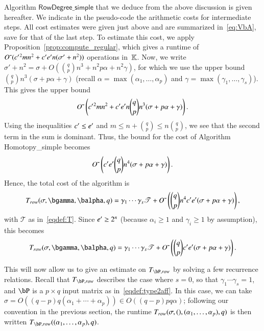 \documentclass[amsthm]{elsart}
\begin{document}
Algorithm $\mathsf{RowDegree\_simple}$ that we deduce from the above
discussion is given hereafter. We indicate in the pseudo-code the
arithmetic costs for intermediate steps. All cost estimates were given
just above and are summarized in~\eqref{eq:VbA}, save for that of the
last step. To estimate this cost, we apply
Proposition~\ref{prop:compute_regular}, which gives a runtime of
$\softO(\rc^2 m n^2 + \rc \re n (\sigma' + n^2))$ operations in~$\KK$.
Now, we write $\sigma'+ n^2 = \sigma +O( {q \choose p} n^3 + n^2 p
\alpha + n^2 \gamma)$, for which we use the upper bound ${q \choose p}
n^3(\sigma + p\alpha + \gamma)$ (recall $\alpha=\max(\alpha_1, \ldots,
\alpha_p)$ and $\gamma=\max(\gamma_1, \ldots, \gamma_s)$).  This gives
the upper bound
\[
\softO\left (\rc^2 m n^2 + \rc\re n {q \choose p} n^3(\sigma + p\alpha + \gamma )\right ).
\]
Using the inequalities $\rc \le \re$ and $m\leq n + {q \choose p} \le n {q \choose p}$,
we see that the second term in the sum is dominant.
Thus, the bound for the cost of Algorithm {\sf Homotopy\_simple} becomes
\[
\softO\left ( \rc\re {q \choose p} n^4(\sigma + p\alpha + \gamma) \right ).
\]
Hence, the total cost of the algorithm is
\begin{align*}
  T_{\rm row}(\sigma,\bgamma,\balpha,q)= \gamma_1 \cdots\gamma_s \mathscr{T} +
  \softO\left (  {q \choose p} n^4 \rc  \re ( \sigma + p \alpha +\gamma )  \right ),  
\end{align*}
with $\mathscr{T}$ as in~\eqref{eqdef:T}. Since $\re \ge 2^n$ (because
$\alpha_i\geq 1$ and $\gamma_i\geq 1$ by assumption), this becomes
\begin{align}\label{eq:recT}
  T_{\rm row}(\sigma,\bgamma,\balpha,q)= \gamma_1 \cdots\gamma_s \mathscr{T} +
  \softO\left (  {q \choose p}  \rc  \re ( \sigma + p \alpha +\gamma )  \right ).
\end{align}

This will now allow us to give an estimate on $T_{\bP,{\rm row}}$ by
solving a few recurrence relations. Recall that $T_{\bP,{\rm row}}$ describes
the case where $s=0$, so that $\gamma_1 \cdots \gamma_s=1$, and $\bP$
is a $p \times q$ input matrix as in~\eqref{eqdef:type2aff}. In this
case, we can take $\sigma=O((q-p) q(\alpha_1 + \cdots + \alpha_p)) \in
O((q-p)pq\alpha)$; following our convention in the previous section,
the runtime $T_{\rm row}(\sigma,(),(\alpha_1,\dots,\alpha_p),q)$ is
then written $T_{\bP,{\rm row}}((\alpha_1,\dots,\alpha_p),q)$.
\end{document}

